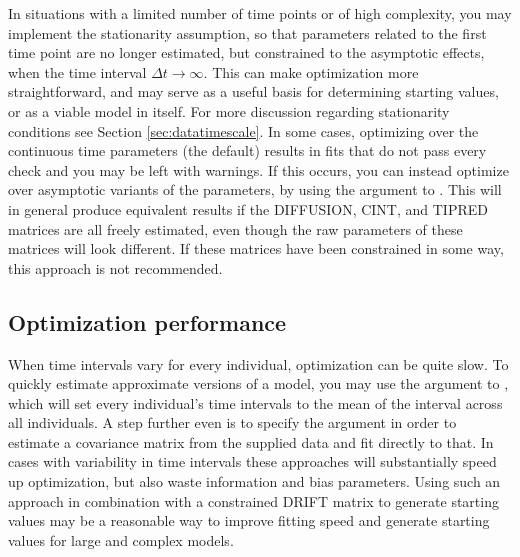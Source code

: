 \documentclass[nojss]{jss}\usepackage[]{graphicx}\usepackage[]{color}
\begin{document}
In situations with a limited number of time points or of high complexity, you may implement the stationarity assumption, so that parameters related to the first time point are no longer estimated, but constrained to the asymptotic effects, when the time interval $\Delta t\to\infty$. This can make optimization more straightforward, and may serve as a useful basis for determining starting values, or as a viable model in itself.  For more discussion regarding stationarity conditions see Section \ref{sec:datatimescale}. 
In some cases, optimizing over the continuous time parameters (the default) results in fits that do not pass every check and you may be left with warnings. If this occurs, you can instead optimize over asymptotic variants of the parameters, by using the argument  to . This will in general produce equivalent results if the DIFFUSION, CINT, and TIPRED matrices are all freely estimated, even though the raw parameters of these matrices will look different. If these matrices have been constrained in some way, this approach is not recommended.

\subsection{Optimization performance}\nopagebreak
When time intervals vary for every individual, optimization can be quite slow.  To quickly estimate approximate versions of a model, you may use the  argument to , which will set every individual's time intervals to the mean of the interval across all individuals. A step further even is to specify the argument  in order to estimate a covariance matrix from the supplied data and fit directly to that. In cases with variability in time intervals these approaches will substantially speed up optimization, but also waste information and bias parameters. Using such an approach in combination with a constrained DRIFT matrix to generate starting values may be a reasonable way to improve fitting speed and generate starting values for large and complex models.
\end{document}
